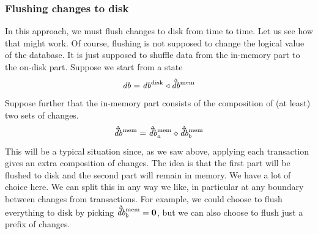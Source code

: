 \documentclass[11pt,a4paper]{article}
\newcommand\deltavar[1]{\accentset{\Delta}{#1}}
\begin{document}
\subsubsection{Flushing changes to disk}
In this approach, we must flush changes to disk from time to time. Let us see
how that might work. Of course, flushing is not supposed to change the logical
value of the database. It is just supposed to shuffle data from the in-memory
part to the on-disk part. Suppose we start from a state
\[
\mathit{db} = \mathit{db}^{\mathrm{disk}}
      \triangleleft \deltavar{\mathit{db}}^{\mathrm{mem}}
\]
Suppose further that the in-memory part consists of the composition of (at
least) two sets of changes.
\[
\deltavar{\mathit{db}}^{\mathrm{mem}} = \deltavar{\mathit{db}}^{\mathrm{mem}}_a \diamond \deltavar{\mathit{db}}^{\mathrm{mem}}_b
\]
This will be a typical situation since, as we saw above, applying each
transaction gives an extra composition of changes. The idea is that the first
part will be flushed to disk and the second part will remain in memory. We have
a lot of choice here. We can split this in any way we like, in particular at
any boundary between changes from transactions. For example, we could choose to flush
everything to disk by picking
$\deltavar{\mathit{db}}^{\mathrm{mem}}_b = \mathbf{0}$,
but we can also choose to flush just a prefix of changes.
\end{document}
